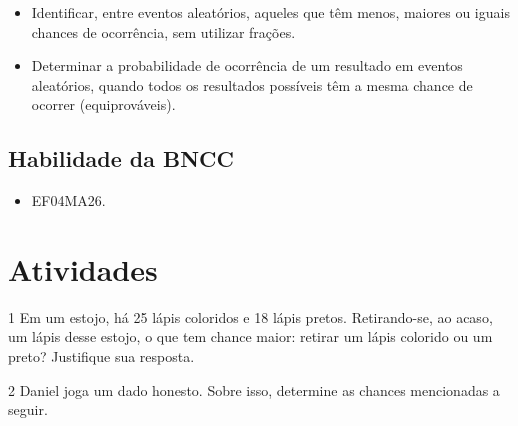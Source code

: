 \begin{itemize}
\item Identificar, entre eventos aleatórios, aqueles que têm menos, maiores ou
iguais chances de ocorrência, sem utilizar frações.

\item Determinar a probabilidade de ocorrência de um resultado em eventos
aleatórios, quando todos os resultados possíveis têm a mesma chance de
ocorrer (equiprováveis).
\end{itemize}

\subsection{Habilidade da BNCC}

\begin{itemize}
\item EF04MA26.
\end{itemize}


\pagebreak
\section*{Atividades}

\num{1} Em um estojo, há 25 lápis coloridos e 18 lápis pretos. Retirando-se, ao
acaso, um lápis desse estojo, o que tem chance maior: retirar um lápis
colorido ou um preto? Justifique sua resposta.

\begin{mdframed}[linewidth=2pt,linecolor=salmao,roundcorner=2pt]
\vspace{2cm}
\end{mdframed}

\num{2} Daniel joga um dado honesto. Sobre isso, determine as chances mencionadas a seguir.


